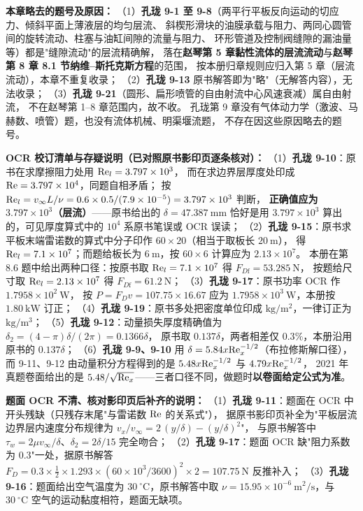 \begin{tishi}
\textbf{本章略去的题号及原因：}
（1）\textbf{孔珑 9-1 至 9-8}（两平行平板反向运动的切应力、倾斜平面上薄液层的均匀层流、
斜楔形滑块的油膜承载与阻力、两同心圆管间的旋转流动、柱塞与油缸间隙的流量与阻力、
环形管道及控制阀缝隙的漏油量等）都是"缝隙流动"的层流精确解，
落在\textbf{赵琴第 5 章黏性流体的层流流动}与\textbf{赵琴第 8 章 8.1 节纳维--斯托克斯方程}的范围，
按本册归章规则应归入第 5 章（层流流动），本章不重复收录；
（2）\textbf{孔珑 9-13} 原书解答即为"略"（无解答内容），无法收录；
（3）\textbf{孔珑 9-21}（圆形、扁形喷管的自由射流中心风速衰减）属自由射流，
不在赵琴第 1--8 章范围内，故不收。
孔珑第 9 章没有气体动力学（激波、马赫数、喷管）题，也没有流体机械、明渠堰流题，
不存在因这些原因略去的题号。
\end{tishi}

\begin{tishi}
\textbf{OCR 校订清单与存疑说明（已对照原书影印页逐条核对）：}
（1）\textbf{孔珑 9-10}：原书在求摩擦阻力处用 $\mathrm{Re}_l=3.797\times10^{3}$，
而在求边界层厚度处印成 $\mathrm{Re}=3.797\times10^{4}$，同题自相矛盾；
按 $\mathrm{Re}_l=v_\infty L/\nu=0.6\times0.5/(7.9\times10^{-5})=3.797\times10^{3}$ 判断，
\textbf{正确值应为 $3.797\times10^{3}$（层流）}——原书给出的 $\delta=47.387\ \mathrm{mm}$
恰好是用 $3.797\times10^{3}$ 算出的，可见厚度算式中的 $10^{4}$ 系原书笔误或 OCR 误读；
（2）\textbf{孔珑 9-15}：原书求平板末端雷诺数的算式中分子印作 $60\times20$（相当于取板长 $20\ \mathrm{m}$），
得 $\mathrm{Re}_l=7.1\times10^{7}$；而题给板长为 $6\ \mathrm{m}$，按 $60\times6$ 计算应为 $2.13\times10^{7}$。
本册在第 8.6 题中给出两种口径：按原书取 $\mathrm{Re}_l=7.1\times10^{7}$ 得 $F_{D\mathrm{f}}=53.285\ \mathrm{N}$，
按题给尺寸取 $\mathrm{Re}_l=2.13\times10^{7}$ 得 $F_{D\mathrm{f}}=61.2\ \mathrm{N}$；
（3）\textbf{孔珑 9-17}：原书功率 OCR 作 $1.7958\times10^{2}\ \mathrm{W}$，
按 $P=F_Dv=107.75\times16.67$ 应为 $1.7958\times10^{3}\ \mathrm{W}$，本册按 $1.80\ \mathrm{kW}$ 订正；
（4）\textbf{孔珑 9-19}：原书多处把密度单位印成 $\mathrm{kg/m^2}$，一律订正为 $\mathrm{kg/m^3}$；
（5）\textbf{孔珑 9-12}：动量损失厚度精确值为 $\delta_2=(4-\pi)\delta/(2\pi)=0.1366\delta$，
原书取 $0.137\delta$，两者相差仅 $0.3\%$，本册沿用原书的 $0.137\delta$；
（6）\textbf{孔珑 9-9、9-10} 用 $\delta=5.84x\mathrm{Re}_x^{-1/2}$（布拉修斯解口径），
而 9-11、9-12 由动量积分方程得到的是 $5.48x\mathrm{Re}_x^{-1/2}$ 与 $4.79x\mathrm{Re}_x^{-1/2}$，
2021 年真题卷面给出的是 $5.48/\sqrt{\mathrm{Re}_x}$——三者口径不同，做题时\textbf{以卷面给定公式为准}。
\end{tishi}

\begin{tishi}
\textbf{题面 OCR 不清、核对影印页后补齐的说明：}
（1）\textbf{孔珑 9-11}：题面在 OCR 中开头残缺（只残存末尾"与雷诺数 $\mathrm{Re}$ 的关系式"），
据原书影印页补全为"平板层流边界层内速度分布规律为 $v_x/v_\infty=2\,(y/\delta)-(y/\delta)^{2}$"，
与原书解答中 $\tau_w=2\mu v_\infty/\delta$、$\delta_2=2\delta/15$ 完全吻合；
（2）\textbf{孔珑 9-17}：题面 OCR 缺"阻力系数为 $0.3$"一处，据原书解答
$F_D=0.3\times\frac{1}{2}\times1.293\times(60\times10^{3}/3600)^{2}\times2=107.75\ \mathrm{N}$ 反推补入；
（3）\textbf{孔珑 9-16}：题面给出空气温度为 $30\ ^{\circ}\mathrm{C}$，原书解答中取
$\nu=15.95\times10^{-6}\ \mathrm{m^2/s}$，与 $30\ ^{\circ}\mathrm{C}$ 空气的运动黏度相符，题面无缺项。
\end{tishi}

